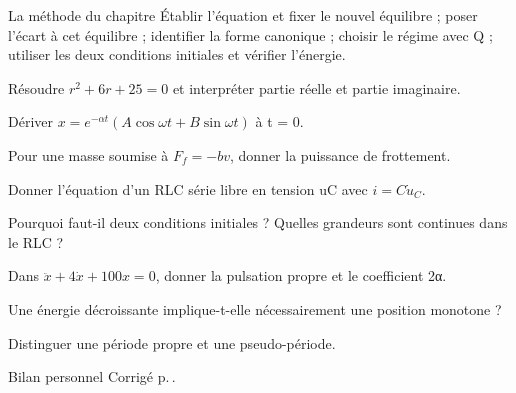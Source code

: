 \begin{methode}{La méthode du chapitre}
Établir l’équation et fixer le nouvel équilibre ; poser l’écart à cet équilibre ; identifier la forme canonique ; choisir le régime avec Q ; utiliser les deux conditions initiales et vérifier l’énergie.
\end{methode}


\begin{questions}
\item Résoudre $r^2+6r+25=0$ et interpréter partie réelle et partie imaginaire.
\item Dériver $x=e^{-\alpha t}(A\cos\omega t+B\sin\omega t)$ à t = 0.
\item Pour une masse soumise à $F_f=-bv$, donner la puissance de frottement.
\item Donner l’équation d’un RLC série libre en tension uC avec $i=C\dot u_C$.
\item Pourquoi faut-il deux conditions initiales ? Quelles grandeurs sont continues dans le RLC ?
\item Dans $\ddot x+4\dot x+100x=0$, donner la pulsation propre et le coefficient 2α.
\item Une énergie décroissante implique-t-elle nécessairement une position monotone ?
\item Distinguer une période propre et une pseudo-période.
\end{questions}
\begin{docu}{Bilan personnel}
Corrigé p.\,\pageref{corr-diag}.
\end{docu}


